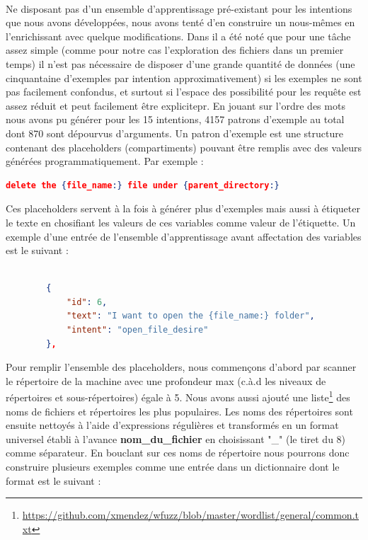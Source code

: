 		\paragraph{}
		\label{nlu_dataset}
		Ne disposant pas d'un ensemble d'apprentissage pré-existant pour les intentions que nous avons développées, nous avons tenté d'en construire un nous-mêmes en l'enrichissant avec quelque modifications. Dans \citep{rasa_nlu} il a été noté que pour une tâche assez simple (comme pour notre cas l'exploration des fichiers dans un premier temps) il n'est pas nécessaire de disposer d'une grande quantité de données (une cinquantaine d'exemples par intention approximativement) si les exemples ne sont pas facilement confondus, et surtout si l'espace des possibilité pour les requête est assez réduit et peut facilement être explicitepr. En jouant sur l'ordre des mots nous avons pu générer pour les 15 intentions, 4157 patrons d'exemple au total dont 870 sont dépourvus d'arguments. Un patron d'exemple est une structure contenant des placeholders (compartiments) pouvant être remplis avec des valeurs générées programmatiquement. Par exemple : 
		\begin{lstlisting}[language=json]
		delete the {file_name:} file under {parent_directory:}\end{lstlisting}
		Ces placeholders servent à la fois à générer plus d'exemples mais aussi à étiqueter le texte en chosifiant les valeurs de ces variables comme valeur de l'étiquette. Un exemple d'une entrée de l'ensemble d'apprentissage avant affectation des variables est le suivant : 
		\begin{lstlisting}[language=json]
		
		{
			"id": 6,
			"text": "I want to open the {file_name:} folder",
			"intent": "open_file_desire"
		},
		\end{lstlisting}
		Pour remplir l'ensemble des placeholders, nous commençons d'abord par scanner le répertoire de la machine avec une profondeur max (c.à.d les niveaux de répertoires et sous-répertoires) égale à 5. Nous avons aussi ajouté une liste\footnote{\url{https://github.com/xmendez/wfuzz/blob/master/wordlist/general/common.txt}} des noms de fichiers et répertoires les plus populaires.
		Les noms des répertoires sont ensuite nettoyés à l'aide d'expressions régulières et transformés en un format universel établi à l'avance \textbf{nom\_du\_fichier} en choisissant "\_" (le tiret du 8) comme séparateur. En bouclant sur ces noms de répertoire nous pourrons donc construire plusieurs exemples comme une entrée dans un dictionnaire dont le format est le suivant : 
